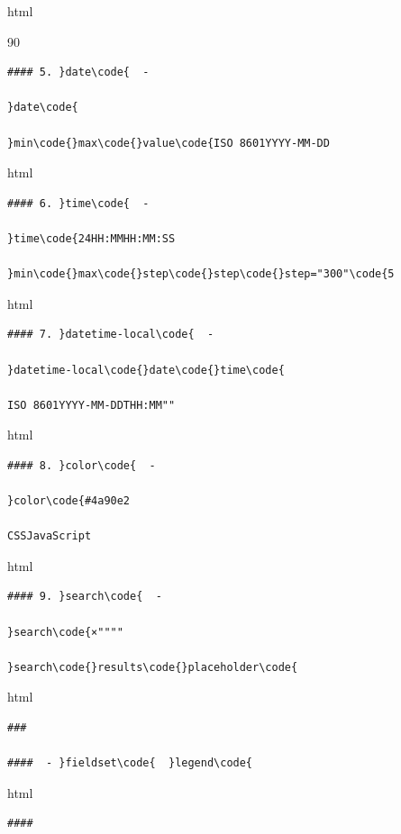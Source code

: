 html

90

\begin{lstlisting}
#### 5. }date\code{  - 

}date\code{

}min\code{}max\code{}value\code{ISO 8601YYYY-MM-DD

\end{lstlisting}

html

\begin{lstlisting}
#### 6. }time\code{  - 

}time\code{24HH:MMHH:MM:SS

}min\code{}max\code{}step\code{}step\code{}step="300"\code{5

\end{lstlisting}

html

\begin{lstlisting}
#### 7. }datetime-local\code{  - 

}datetime-local\code{}date\code{}time\code{

ISO 8601YYYY-MM-DDTHH:MM""

\end{lstlisting}

html

\begin{lstlisting}
#### 8. }color\code{  - 

}color\code{#4a90e2

CSSJavaScript

\end{lstlisting}

html

\begin{lstlisting}
#### 9. }search\code{  - 

}search\code{×""""

}search\code{}results\code{}placeholder\code{

\end{lstlisting}

html

\begin{lstlisting}
### 

####  - }fieldset\code{  }legend\code{

\end{lstlisting}

html

\begin{lstlisting}
#### 

\end{lstlisting}

